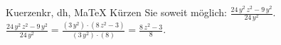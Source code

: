 \begin{MAufgabe}{Kuerzen}{kr, dh, MaTeX}
K\"urzen Sie soweit m\"oglich: $\frac{24\, y^2\, z^2 - 9\, y^2}{24\, y^2}$.\\ 
\ifLsg\MLoesung
\quad $\frac{24\, y^2\, z^2 - 9\, y^2}{24\, y^2}=\frac{(3\, y^2)\cdot(8\, z^2 - 3)}{(3\, y^2)\cdot(8)}=\frac{8\, z^2 - 3}{8}$.\else\relax\fi
 \end{MAufgabe}